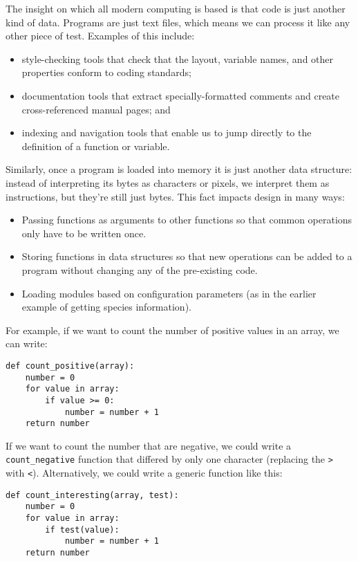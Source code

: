 \documentclass[10pt,letterpaper]{article}
\begin{document}
The insight on which all modern computing is based is that
code is just another kind of data.
Programs are just text files,
which means we can process it like any other piece of test.
Examples of this include:

\begin{itemize}
\item
  style-checking tools that check that the layout, variable names, and other properties
  conform to coding standards;
\item
  documentation tools that extract specially-formatted comments
  and create cross-referenced manual pages; and
\item
  indexing and navigation tools that enable us to jump directly to
  the definition of a function or variable.
\end{itemize}

Similarly,
once a program is loaded into memory it is just another data structure:
instead of interpreting its bytes as characters or pixels,
we interpret them as instructions,
but they're still just bytes.
This fact impacts design in many ways:

\begin{itemize}
\item
  Passing functions as arguments to other functions
  so that common operations only have to be written once.
\item
  Storing functions in data structures
  so that new operations can be added to a program
  without changing any of the pre-existing code.
\item
  Loading modules based on configuration parameters
  (as in the earlier example of getting species information).
\end{itemize}

For example,
if we want to count the number of positive values in an array,
we can write:

\begin{lstlisting}
def count_positive(array):
    number = 0
    for value in array:
        if value >= 0:
            number = number + 1
    return number
\end{lstlisting}

If we want to count the number that are negative,
we could write a \texttt{count\_negative} function that differed by only one character
(replacing the \texttt{>} with \texttt{<}).
Alternatively,
we could write a generic function like this:

\begin{lstlisting}
def count_interesting(array, test):
    number = 0
    for value in array:
        if test(value):
            number = number + 1
    return number
\end{lstlisting}
\end{document}
